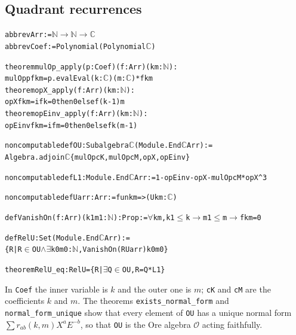 \documentclass[11pt]{amsart}
\theoremstyle{definition}
\newcommand{\lean}[1]{\texttt{#1}}
\newcommand{\C}{\mathbb{C}}
\newcommand{\NN}{\mathbb{N}}
\newcommand{\cO}{\mathcal{O}}
\begin{document}
\subsection*{Quadrant recurrences}
\begin{alltt}\small
abbrev Arr := \(\NN\) \(\to\) \(\NN\) \(\to\) \(\C\)
abbrev Coef := Polynomial (Polynomial \(\C\))

theorem mulOp_apply (p : Coef) (f : Arr) (k m : \(\NN\)) :
    mulOp p f k m = p.evalEval (k : \(\C\)) (m : \(\C\)) * f k m
theorem opX_apply (f : Arr) (k m : \(\NN\)) :
    opX f k m = if k = 0 then 0 else f (k - 1) m
theorem opEinv_apply (f : Arr) (k m : \(\NN\)) :
    opEinv f k m = if m = 0 then 0 else f k (m - 1)

noncomputable def OU : Subalgebra \(\C\) (Module.End \(\C\) Arr) :=
  Algebra.adjoin \(\C\) \{mulOp cK, mulOp cM, opX, opEinv\}

noncomputable def L1 : Module.End \(\C\) Arr := 1 - opEinv - opX - mulOp cM * opX ^ 3

noncomputable def Uarr : Arr := fun k m => (U k m : \(\C\))

def VanishOn (f : Arr) (k1 m1 : \(\NN\)) : Prop := \(\forall\) k m, k1 \(\le\) k \(\to\) m1 \(\le\) m \(\to\) f k m = 0

def RelU : Set (Module.End \(\C\) Arr) :=
  \{R | R \(\in\) OU \(\land\) \(\exists\) k0 m0 : \(\NN\), VanishOn (R Uarr) k0 m0\}

theorem RelU_eq : RelU = \{R | \(\exists\) Q \(\in\) OU, R = Q * L1\}
\end{alltt}
In \lean{Coef} the inner variable is $k$ and the outer one is $m$; \lean{cK} and \lean{cM} are the coefficients $k$ and $m$. The theorems \lean{exists\_normal\_form} and \lean{normal\_form\_unique} show that every element of \lean{OU} has a unique normal form $\sum r_{ab}(k,m)X^aE^{-b}$, so that \lean{OU} is the Ore algebra $\cO$ acting faithfully.
\end{document}
